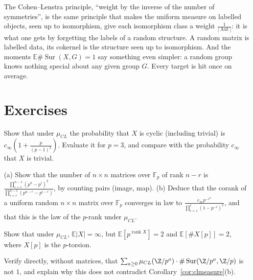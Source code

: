 \begin{beauty}
The Cohen--Lenstra principle, ``weight by the inverse of the number of symmetries'', is the same principle that makes the uniform measure on labelled objects, seen up to isomorphism, give each isomorphism class a weight $\frac1{|\operatorname{Aut}|}$: it is what one gets by forgetting the labels of a random structure. A random matrix is labelled data, its cokernel is the structure seen up to isomorphism. And the moments $\mathbb E\#\operatorname{Sur}(X,G)=1$ say something even simpler: a random group knows nothing special about any given group $G$. Every target is hit once on average.
\end{beauty}

\section{Exercises}

\begin{exercise}[$\star$]\label{ex:clcyclic}
Show that under $\mu_{CL}$ the probability that $X$ is cyclic (including trivial) is $c_\infty(1+\frac p{(p-1)^2})$. Evaluate it for $p=3$, and compare with the probability $c_\infty$ that $X$ is trivial.
\end{exercise}

\begin{exercise}[$\star\star$]\label{ex:clrank}
(a) Show that the number of $n\times n$ matrices over $\mathbb F_p$ of rank $n-r$ is $\frac{\prod_{i=r}^{n-1}(p^n-p^i)^2}{\prod_{i=r}^{n-1}(p^{n-r}-p^{i-r})}$, by counting pairs (image, map). (b) Deduce that the corank of a uniform random $n\times n$ matrix over $\mathbb F_p$ converges in law to $\frac{c_\infty p^{-r^2}}{\prod_{i=1}^r(1-p^{-i})^2}$, and that this is the law of the $p$-rank under $\mu_{CL}$.
\end{exercise}

\begin{exercise}[$\star$]\label{ex:clmean}
Show that under $\mu_{CL}$, $\mathbb E|X|=\infty$, but $\mathbb E[p^{\operatorname{rank}X}]=2$ and $\mathbb E[\#X[p]]=2$, where $X[p]$ is the $p$-torsion.
\end{exercise}

\begin{exercise}[$\star\star$]\label{ex:clsur}
Verify directly, without matrices, that $\sum_{a\ge0}\mu_{CL}(\Z/p^a)\cdot\#\operatorname{Sur}(\Z/p^a,\Z/p)$ is not $1$, and explain why this does not contradict Corollary~\ref{cor:clmeasure}(b).
\end{exercise}

